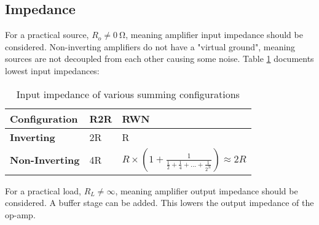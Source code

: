 \subsection{Impedance}{\label{dac_impedance}}

For a practical source, $R_o \neq \SI{0}{\ohm}$, meaning amplifier input impedance should be considered. Non-inverting amplifiers do not have a "virtual ground",
meaning sources are not decoupled from each other \cite{SummingAmplifierBasics} causing some noise. Table \ref{tab:dac_amplifier_impedance} documents lowest input impedances:

\begin{table}[!h]
  \centering
  \renewcommand{\arraystretch}{1.2}
  \begin{tabular}{ |p{3cm}|p{6cm}|p{6cm}| }
    \hline
    \textbf{Configuration}         & \textbf{R2R}                               & \textbf{RWN}                      \\
    \hline
    \textbf{Inverting}             & 2R                                         & R                                 \\
    \hline
    \textbf{Non-Inverting}         & 4R                                         & $R \times \left(1 + \frac{1}{\frac{1}{2} + \frac{1}{4} + ... + \frac{1}{2^N}}\right) \approx 2R$                              \\
    \hline
  \end{tabular}
  \caption{Input impedance of various summing configurations}
  {\label{tab:dac_amplifier_impedance}}
\end{table}

\noindent For a practical load, $R_L \neq \infty$, meaning amplifier output impedance should be considered.
A buffer stage can be added. This lowers the output impedance of the op-amp.